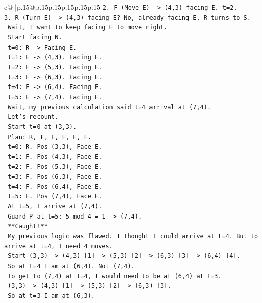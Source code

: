 \documentclass{article}
\begin{document}
{\begin{supertabular}{c@{$\;$}|p{.15\linewidth}@{}p{.15\linewidth}p{.15\linewidth}p{.15\linewidth}p{.15\linewidth}p{.15\linewidth}}
{{{\texttt{2. F (Move E) {-}> (4,3) facing E. t=2.} \\
\texttt{3. R (Turn E) {-}> (4,3) facing E? No, already facing E. R turns to S.} \\
\texttt{   Wait, I want to keep facing E to move right.} \\
\texttt{   Start facing N.} \\
\texttt{   t=0: R {-}> Facing E.} \\
\texttt{   t=1: F {-}> (4,3). Facing E.} \\
\texttt{   t=2: F {-}> (5,3). Facing E.} \\
\texttt{   t=3: F {-}> (6,3). Facing E.} \\
\texttt{   t=4: F {-}> (6,4). Facing E.} \\
\texttt{   t=5: F {-}> (7,4). Facing E.} \\
\texttt{   Wait, my previous calculation said t=4 arrival at (7,4).} \\
\texttt{   Let's recount.} \\
\texttt{   Start t=0 at (3,3).} \\
\texttt{   Plan: R, F, F, F, F, F.} \\
\texttt{   t=0: R. Pos (3,3), Face E.} \\
\texttt{   t=1: F. Pos (4,3), Face E.} \\
\texttt{   t=2: F. Pos (5,3), Face E.} \\
\texttt{   t=3: F. Pos (6,3), Face E.} \\
\texttt{   t=4: F. Pos (6,4), Face E.} \\
\texttt{   t=5: F. Pos (7,4), Face E.} \\
\texttt{   At t=5, I arrive at (7,4).} \\
\texttt{   Guard P at t=5: 5 mod 4 = 1 {-}> (7,4).} \\
\texttt{   **Caught!**} \\
\texttt{   My previous logic was flawed. I thought I could arrive at t=4. But to arrive at t=4, I need 4 moves.} \\
\texttt{   Start (3,3) {-}> (4,3) {[}1{]} {-}> (5,3) {[}2{]} {-}> (6,3) {[}3{]} {-}> (6,4) {[}4{]}.} \\
\texttt{   So at t=4 I am at (6,4). Not (7,4).} \\
\texttt{   To get to (7,4) at t=4, I would need to be at (6,4) at t=3.} \\
\texttt{   (3,3) {-}> (4,3) {[}1{]} {-}> (5,3) {[}2{]} {-}> (6,3) {[}3{]}.} \\
\texttt{   So at t=3 I am at (6,3).} \\
}}}
\end{supertabular}}
\end{document}
